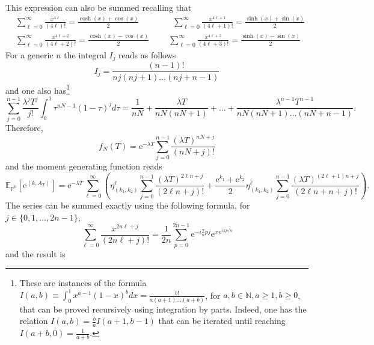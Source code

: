 \documentclass[a4paper,11pt]{article}
\numberwithin{equation}{section}
\begin{document}
This expression can also be summed recalling that
\begin{align}
    &\sum_{\ell=0}^\infty \frac{ x^{4\ell}}{(4\ell)!} = \frac{\cosh(x)+\cos(x)}{2} \qquad \qquad \sum_{\ell=0}^\infty \frac{ x^{4\ell+1}}{(4\ell+1)!} = \frac{\sinh(x)+\sin(x)}{2} \nonumber \\
    & \sum_{\ell=0}^\infty \frac{ x^{4\ell+2}}{(4\ell+2)!} = \frac{\cosh(x)-\cos(x)}{2} \qquad \; \sum_{\ell=0}^\infty \frac{ x^{4\ell+3}}{(4\ell+3)!} = \frac{\sinh(x)-\sin(x)}{2} \nonumber
\end{align}
For a generic $n$ the integral $I_j$ reads as follows
\begin{equation}
    I_j = \frac{(n-1)!}{nj(nj+1)\ldots (nj+n-1)}
\end{equation}
and one also has\footnote{These are instances of the formula $I(a,b) \equiv \int_0^1 x^{a-1} (1-x)^b dx = \frac{b!}{a(a+1)\ldots (a+b)}$, for $a,b \in \mathbb{N}, a\geq 1,b \geq 0$, that can be proved recursively using integration by parts. Indeed, one has the relation $I(a,b)= \frac{b}{a}I(a+1,b-1)$ that can be iterated until reaching $I(a+b,0)=\frac{1}{a+b}$.  }
\begin{equation}
    \sum_{j=0}^{n-1}\frac{\lambda^j T^j}{j!} \int_0^1 \tau^{nN-1} (1-\tau)^j d\tau = \frac{1}{nN} + \frac{\lambda T}{nN(nN + 1)}+ \ldots+ \frac{\lambda^{n-1}T^{n-1}}{nN(nN+1)\ldots (nN+n-1)}.
\end{equation}
Therefore, 
\begin{equation}
   f_N(T)= \mathrm{e}^{-\lambda T}\sum_{j=0}^{n-1}\frac{(\lambda T)^{n N+j}}{(n N + j)!}
\end{equation}
and the moment generating function reads
\begin{equation}
   \mathbb{E}_{\mathbb{P}^0} \left[ \mathrm{e}^{\left\langle k, A_T \right\rangle} \right] = \mathrm{e}^{-\lambda T} \sum_{\ell=0}^\infty \left(  \eta_{(k_1,k_2)}^\ell \sum_{j=0}^{n-1}\frac{(\lambda T)^{2\ell n+j}}{(2 \ell n + j)!} + \frac{\mathrm{e}^{k_1}+\mathrm{e}^{k_2}}{2}\eta_{(k_1,k_2)}^\ell  \sum_{j=0}^{n-1}\frac{(\lambda T)^{(2\ell +1) n+j}}{(2 \ell n + n + j)!} \right).
\end{equation}
The series can be summed exactly using the following formula, for $j \in \{0,1,\ldots, 2n-1\}$,
\begin{equation}
    \sum_{\ell =0}^\infty \frac{x^{2n\ell+j}}{(2n\ell +j)!} = \frac{1}{2n}\sum_{p=0}^{2n-1} \mathrm{e}^{-i\frac{\pi}{n}p j} \mathrm{e}^{x \, \mathrm{e}^{i\pi p/n}} 
\end{equation}
and the result is
\end{document}
